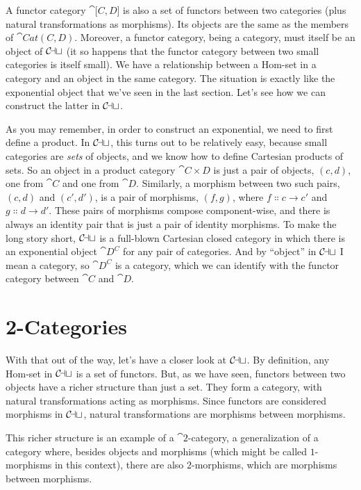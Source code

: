 \noindent
A functor category $\cat{{[}C, D{]}}$ is also a set of functors between two
categories (plus natural transformations as morphisms). Its objects are
the same as the members of $\cat{Cat(C, D)}$. Moreover, a functor category,
being a category, must itself be an object of $\mathcal{C\mkern-3mu at}$ (it so
happens that the functor category between two small categories is itself
small). We have a relationship between a Hom-set in a category and an
object in the same category. The situation is exactly like the
exponential object that we've seen in the last section. Let's see how we
can construct the latter in $\mathcal{C\mkern-3mu at}$.

As you may remember, in order to construct an exponential, we need to
first define a product. In $\mathcal{C\mkern-3mu at}$, this turns out to be relatively
easy, because small categories are \emph{sets} of objects, and we know
how to define Cartesian products of sets. So an object in a product
category $\cat{C\times D}$ is just a pair of objects, $(c, d)$, one from $\cat{C}$
and one from $\cat{D}$. Similarly, a morphism between two such pairs,
$(c, d)$ and $(c', d')$, is a pair of morphisms, $(f, g)$, where
$f \Colon c \to c'$ and $g \Colon d \to d'$. These pairs of morphisms
compose component-wise, and there is always an identity pair that is
just a pair of identity morphisms. To make the long story short,
$\mathcal{C\mkern-3mu at}$ is a full-blown Cartesian closed category in which there is
an exponential object $\cat{D^C}$ for any pair of categories.
And by ``object'' in $\mathcal{C\mkern-3mu at}$ I mean a category, so
$\cat{D^C}$ is a category, which we can identify with the
functor category between $\cat{C}$ and $\cat{D}$.

\section{2-Categories}

With that out of the way, let's have a closer look at $\mathcal{C\mkern-3mu at}$. By
definition, any Hom-set in $\mathcal{C\mkern-3mu at}$ is a set of functors. But, as we
have seen, functors between two objects have a richer structure than
just a set. They form a category, with natural transformations acting as
morphisms. Since functors are considered morphisms in $\mathcal{C\mkern-3mu at}$,
natural transformations are morphisms between morphisms.

This richer structure is an example of a $\cat{2}$-category, a generalization of
a category where, besides objects and morphisms (which might be called
$1$-morphisms in this context), there are also $2$-morphisms, which are
morphisms between morphisms.

